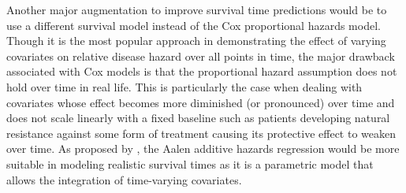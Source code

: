 \documentclass{l4proj}
\begin{document}
Another major augmentation to improve survival time predictions would be to use a different survival model instead of the Cox proportional hazards model. Though it is the most popular approach in demonstrating the effect of varying covariates on relative disease hazard over all points in time, the major drawback associated with Cox models is that the proportional hazard assumption does not hold over time in real life. This is particularly the case when dealing with covariates whose effect becomes more diminished (or pronounced) over time and does not scale linearly with a fixed baseline such as patients developing natural resistance against some form of treatment causing its protective effect to weaken over time. As proposed by \cite{klein2014handbook}, the Aalen additive hazards regression would be more suitable in modeling realistic survival times as it is a parametric model that allows the integration of time-varying covariates. 
\end{document}
